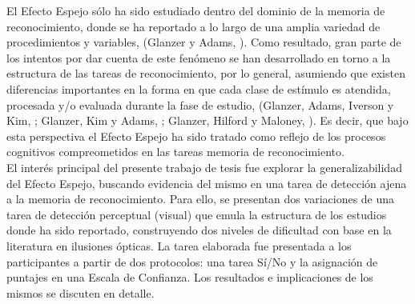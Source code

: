 El Efecto Espejo sólo ha sido estudiado dentro del dominio de la memoria de reconocimiento, donde se ha reportado a lo largo de una amplia variedad de procedimientos y variables, (Glanzer y Adams, \citeyear{1990}). Como resultado, gran parte de los intentos por dar cuenta de este fenómeno se han desarrollado en torno a la estructura de las tareas de reconocimiento, por lo general, asumiendo que existen diferencias importantes en la forma en que cada clase de estímulo es atendida, procesada y/o evaluada durante la fase de estudio, (Glanzer, Adams, Iverson y Kim, \citeyear{Glanzer1993}; Glanzer, Kim y Adams, \citeyear{Glanzer1998}; Glanzer, Hilford y Maloney, \citeyear{Glanzer2009}). Es decir, que bajo esta perspectiva el Efecto Espejo ha sido tratado como reflejo de los procesos cognitivos compreometidos en las tareas memoria de reconocimiento.\\

El interés principal del presente trabajo de tesis fue explorar la generalizabilidad del Efecto Espejo, buscando evidencia del mismo en una tarea de detección ajena a la memoria de reconocimiento. Para ello, se presentan dos variaciones de una tarea de detección perceptual (visual) que emula la estructura de los estudios donde ha sido reportado, construyendo dos niveles de dificultad con base en la literatura en ilusiones ópticas. La tarea elaborada fue presentada a los participantes a partir de dos protocolos: una tarea Sí/No y la asignación de puntajes en una Escala de Confianza. Los resultados e implicaciones de los mismos se discuten en detalle.\\